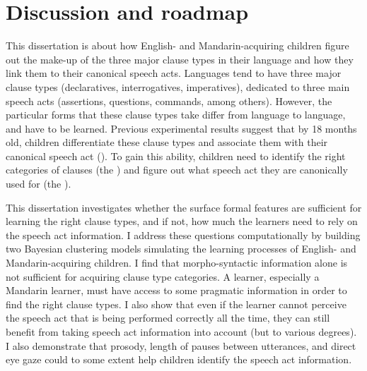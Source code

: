 \section{Discussion and roadmap}
\label{sec:intro:roadmap} 
This dissertation is about how English- and Mandarin-acquiring children figure out the make-up of the three major clause types in their language and how they link them to their canonical speech acts. Languages tend to have three major clause types (declaratives, interrogatives, imperatives), dedicated to three main speech acts (assertions, questions, commands, \cite{sz1985speechact} among others). However, the particular forms that these clause types take differ from language to language, and have to be learned. Previous experimental results suggest that by 18 months old, children differentiate these clause types and associate them with their canonical speech act (\cite{geffenmintz2011,geffenmintz2015wordorder,casillas2017turn,perkins2019,marshmallowqueen}). To gain this ability, children need to identify the right categories of clauses (the ) and figure out what speech act they are canonically used for (the ). 

This dissertation investigates whether the surface formal features are sufficient for learning the right clause types, and if not, how much the learners need to rely on the speech act information. I address these questions computationally by building two Bayesian clustering models simulating the learning processes of English- and Mandarin-acquiring children. I find that morpho-syntactic information alone is not sufficient for acquiring clause type categories. A learner, especially a Mandarin learner, must have access to some pragmatic information in order to find the right clause types. I also show that even if the learner cannot perceive the speech act that is being performed correctly all the time, they can still benefit from taking speech act information into account (but to various degrees). I also demonstrate that prosody, length of pauses between utterances, and direct eye gaze could to some extent help children identify the speech act information.


